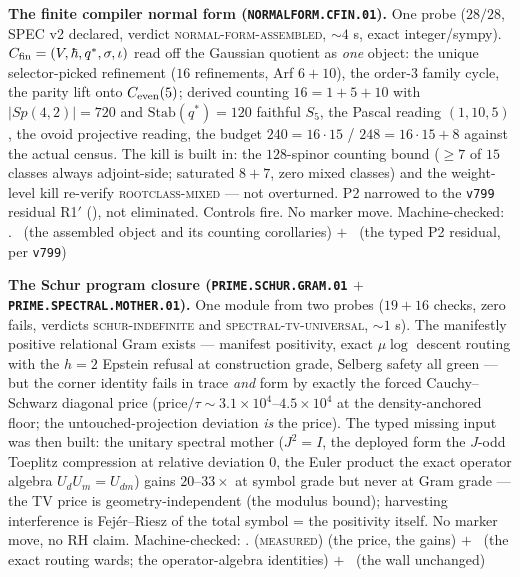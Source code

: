 \documentclass[11pt,a4paper]{article}
\theoremstyle{definition}
\begin{document}
\par\smallskip\noindent\textbf{The finite compiler normal form
(\texttt{NORMALFORM.CFIN.01}).}
One probe ($28/28$, SPEC v2 declared, verdict
\textsc{normal-form-assembled}, ${\sim}4$ s, exact
integer/sympy).  $C_{\rm fin} = (V, \hbar, q^{*}, \sigma, \iota)$
read off the Gaussian quotient as \emph{one} object: the unique
selector-picked refinement ($16$ refinements, Arf $6 + 10$), the
order-$3$ family cycle, the parity lift onto $C_{\rm even}(5)$;
derived counting $16 = 1 + 5 + 10$ with $\lvert Sp(4,2)\rvert =
720$ and $\mathrm{Stab}(q^{*}) = 120$ faithful $S_5$, the Pascal
reading $(1, 10, 5)$, the ovoid projective reading, the budget
$240 = 16\cdot15$ / $248 = 16\cdot15 + 8$ against the actual
census.  The kill is built in: the $128$-spinor counting bound
($\ge 7$ of $15$ classes always adjoint-side; saturated $8 + 7$,
zero mixed classes) and the weight-level kill re-verify
\textsc{rootclass-mixed} --- not overturned.  P2 narrowed to the
\texttt{v799} residual R1$'$ (\mC), not eliminated.  Controls
fire.  No marker move.
Machine-checked: .
\mE\ (the assembled object and its counting corollaries) $+$
\mC\ (the typed P2 residual, per \texttt{v799})
\par\smallskip

\par\smallskip\noindent\textbf{The Schur program closure
(\texttt{PRIME.SCHUR.GRAM.01} $+$
\texttt{PRIME.SPECTRAL.MOTHER.01}).}
One module from two probes ($19 + 16$ checks, zero fails,
verdicts \textsc{schur-indefinite} and
\textsc{spectral-tv-universal}, ${\sim}1$ s).  The manifestly
positive relational Gram exists --- manifest positivity, exact
$\mu\log$ descent routing with the $h = 2$ Epstein refusal at
construction grade, Selberg safety all green --- but the corner
identity fails in trace \emph{and} form by exactly the forced
Cauchy--Schwarz diagonal price
(price$/\tau \sim 3.1\times10^4$--$4.5\times10^4$ at the
density-anchored floor; the untouched-projection deviation
\emph{is} the price).  The typed missing input was then built:
the unitary spectral mother ($J^2 = I$, the deployed form the
$J$-odd Toeplitz compression at relative deviation $0$, the
Euler product the exact operator algebra $U_dU_m = U_{dm}$)
gains $20$--$33\times$ at symbol grade but never at Gram grade
--- the TV price is geometry-independent (the modulus bound);
harvesting interference is Fej\'er--Riesz of the total symbol =
the positivity itself.  No marker move, no RH claim.
Machine-checked: .
(\textsc{measured}) (the price, the gains) $+$ \mE\ (the exact
routing wards; the operator-algebra identities) $+$ \mO\ (the
wall unchanged)
\par\smallskip
\end{document}
